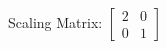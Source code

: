 \documentclass[preview]{standalone}
\begin{document}
\begin{center}
Scaling Matrix: $\begin{bmatrix} 2 & 0 \\ 0 & 1 \end{bmatrix}$
\end{center}
\end{document}
